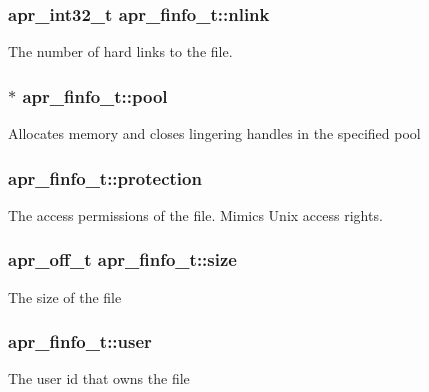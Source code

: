 \subsubsection[{\texorpdfstring{nlink}{nlink}}]{\setlength{\rightskip}{0pt plus 5cm}apr\+\_\+int32\+\_\+t apr\+\_\+finfo\+\_\+t\+::nlink}\hypertarget{structapr__finfo__t_a98598f28735d75aa0c1994efc825e6d9}{}\label{structapr__finfo__t_a98598f28735d75aa0c1994efc825e6d9}
The number of hard links to the file. 
\subsubsection[{\texorpdfstring{pool}{pool}}]{$\ast$ apr\+\_\+finfo\+\_\+t\+::pool}\hypertarget{structapr__finfo__t_a71496f86b5489c87e58e9c03fe468fb8}{}\label{structapr__finfo__t_a71496f86b5489c87e58e9c03fe468fb8}
Allocates memory and closes lingering handles in the specified pool 
\subsubsection[{\texorpdfstring{protection}{protection}}]{ apr\+\_\+finfo\+\_\+t\+::protection}\hypertarget{structapr__finfo__t_a7c09d73ad1957e2c0e6c6b77d94e90ab}{}\label{structapr__finfo__t_a7c09d73ad1957e2c0e6c6b77d94e90ab}
The access permissions of the file. Mimics Unix access rights. 
\subsubsection[{\texorpdfstring{size}{size}}]{\setlength{\rightskip}{0pt plus 5cm}apr\+\_\+off\+\_\+t apr\+\_\+finfo\+\_\+t\+::size}\hypertarget{structapr__finfo__t_a3e47a673c5b82a25a783a732dee6f946}{}\label{structapr__finfo__t_a3e47a673c5b82a25a783a732dee6f946}
The size of the file 
\subsubsection[{\texorpdfstring{user}{user}}]{ apr\+\_\+finfo\+\_\+t\+::user}\hypertarget{structapr__finfo__t_ab79d14bd50f50662d29ad433166c4bc5}{}\label{structapr__finfo__t_ab79d14bd50f50662d29ad433166c4bc5}
The user id that owns the file 
